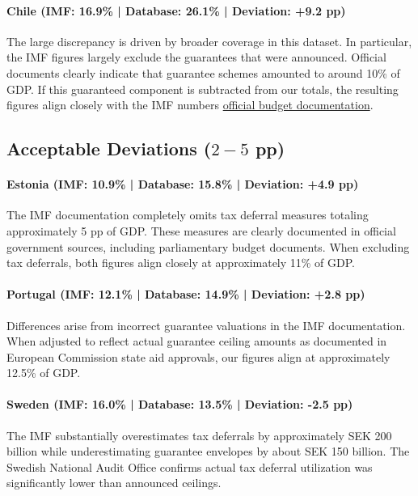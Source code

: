 \documentclass[12pt]{article}
\begin{document}
\paragraph{Chile (IMF: 16.9\% | Database: 26.1\% | Deviation: +9.2 pp)}

The large discrepancy is driven by broader coverage in this dataset. In particular, the IMF figures largely exclude the guarantees that were announced. Official documents clearly indicate that guarantee schemes amounted to around 10\% of GDP. If this guaranteed component is subtracted from our totals, the resulting figures align closely with the IMF numbers \href{https://old.hacienda.cl/sala-de-prensa/noticias/historico/ministro-de-hacienda-tras-actualizacion.html}{official budget documentation}.

\subsection{Acceptable Deviations ($2-5$ pp)}

\paragraph{Estonia (IMF: 10.9\% | Database: 15.8\% | Deviation: +4.9 pp)}

The IMF documentation completely omits tax deferral measures totaling approximately 5 pp of GDP. These measures are clearly documented in official government sources, including parliamentary budget documents. When excluding tax deferrals, both figures align closely at approximately 11\% of GDP.

\paragraph{Portugal (IMF: 12.1\% | Database: 14.9\% | Deviation: +2.8 pp)}

Differences arise from incorrect guarantee valuations in the IMF documentation. When adjusted to reflect actual guarantee ceiling amounts as documented in European Commission state aid approvals, our figures align at approximately 12.5\% of GDP.

\paragraph{Sweden (IMF: 16.0\% | Database: 13.5\% | Deviation: -2.5 pp)}

The IMF substantially overestimates tax deferrals by approximately SEK 200 billion while underestimating guarantee envelopes by about SEK 150 billion. The Swedish National Audit Office confirms actual tax deferral utilization was significantly lower than announced ceilings.
\end{document}

